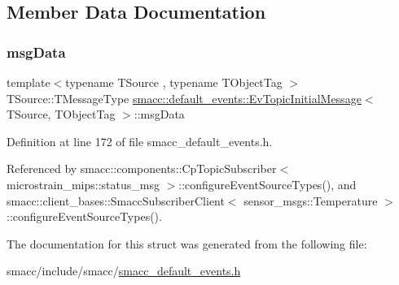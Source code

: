 \subsection{Member Data Documentation}
\mbox{\label{structsmacc_1_1default__events_1_1EvTopicInitialMessage_a989c7cf4210c7750806b081bc73112cd}} 
\subsubsection{\texorpdfstring{msg\+Data}{msgData}}
{\footnotesize\ttfamily template$<$typename T\+Source , typename T\+Object\+Tag $>$ \\
T\+Source\+::\+T\+Message\+Type \hyperlink{structsmacc_1_1default__events_1_1EvTopicInitialMessage}{smacc\+::default\+\_\+events\+::\+Ev\+Topic\+Initial\+Message}$<$ T\+Source, T\+Object\+Tag $>$\+::msg\+Data}



Definition at line 172 of file smacc\+\_\+default\+\_\+events.\+h.



Referenced by smacc\+::components\+::\+Cp\+Topic\+Subscriber$<$ microstrain\+\_\+mips\+::status\+\_\+msg $>$\+::configure\+Event\+Source\+Types(), and smacc\+::client\+\_\+bases\+::\+Smacc\+Subscriber\+Client$<$ sensor\+\_\+msgs\+::\+Temperature $>$\+::configure\+Event\+Source\+Types().



The documentation for this struct was generated from the following file\+:\begin{DoxyCompactItemize}
\item 
smacc/include/smacc/\hyperlink{smacc__default__events_8h}{smacc\+\_\+default\+\_\+events.\+h}\end{DoxyCompactItemize}
